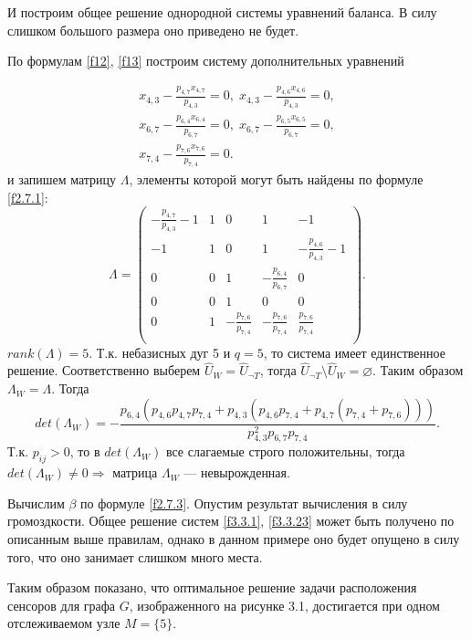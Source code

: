 \documentclass[14pt]{extarticle}%
\begin{document}
И построим общее решение однородной системы уравнений баланса. В силу слишком большого размера оно приведено не будет.

По формулам \eqref{f12}, \eqref{f13} построим систему дополнительных уравнений

\begin{equation}\label{f3.3.23}
\begin{gathered}
x_{4,3}-\frac{p_{4,7} x_{4,7}}{p_{4,3}}=0,\;
x_{4,3}-\frac{p_{4,6} x_{4,6}}{p_{4,3}}=0,\\
x_{6,7}-\frac{p_{6,4} x_{6,4}}{p_{6,7}}=0,\;
x_{6,7}-\frac{p_{6,5} x_{6,5}}{p_{6,7}}=0,\\
x_{7,4}-\frac{p_{7,6} x_{7,6}}{p_{7,4}}=0.
\end{gathered}
\end{equation}
и запишем матрицу $\Lambda$, элементы которой могут быть найдены по формуле \eqref{f2.7.1}:
$$
\Lambda=
\left(
\begin{array}{ccccc}
 -\frac{p_{4,7}}{p_{4,3}}-1 & 1 & 0 & 1 & -1 \\
 -1 & 1 & 0 & 1 & -\frac{p_{4,6}}{p_{4,3}}-1 \\
 0 & 0 & 1 & -\frac{p_{6,4}}{p_{6,7}} & 0 \\
 0 & 0 & 1 & 0 & 0 \\
 0 & 1 & -\frac{p_{7,6}}{p_{7,4}} & -\frac{p_{7,6}}{p_{7,4}} & \frac{p_{7,6}}{p_{7,4}} \\
\end{array}
\right).
$$
$rank(\Lambda)=5$. Т.к. небазисных дуг 5 и $q=5$, то система имеет единственное решение. Соответственно выберем $\widehat{U}_W=\widehat{U}_{\neg T}$, тогда $\widehat{U}_{\neg T}\setminus\widehat{U}_W=\varnothing$. Таким образом $\Lambda_W=\Lambda$.
Тогда 
$$
det(\Lambda_W)=-\frac{p_{6,4} \left(p_{4,6} p_{4,7} p_{7,4}+p_{4,3} \left(p_{4,6} p_{7,4}+p_{4,7} \left(p_{7,4}+p_{7,6}\right)\right)\right)}{p_{4,3}^2 p_{6,7} p_{7,4}}.
$$
Т.к. $p_{ij}>0$, то в $det(\Lambda_W)$ все слагаемые строго положительны, тогда $det(\Lambda_W)\neq 0 \Rightarrow$ матрица $\Lambda_W$ --- невырожденная. 

Вычислим $\beta$ по формуле \eqref{f2.7.3}. Опустим результат вычисления в силу громоздкости.
Общее решение систем \eqref{f3.3.1}, \eqref{f3.3.23} может быть получено по описанным выше правилам, однако в данном примере оно будет опущено в силу того, что оно занимает слишком много места.

Таким образом показано, что оптимальное решение задачи расположения сенсоров для графа $G$, изображенного на рисунке 3.1, достигается при одном отслеживаемом узле $M=\{5\}$.
\end{document}
